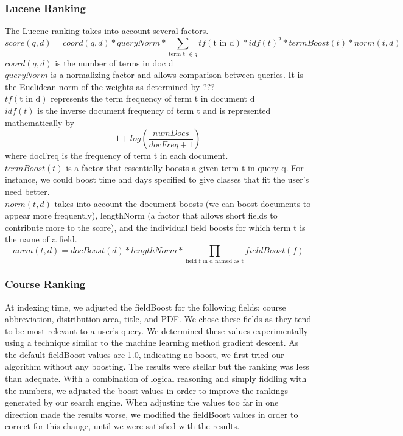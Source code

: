 \documentclass[12pt,letterpaper]{article}
\begin{document}
\subsubsection{Lucene Ranking}
The Lucene ranking takes into account several factors. 
\begin{equation}
  score(q,d) = coord(q,d) * queryNorm * \sum_{\text{term t } \in q}{tf(\text{t in d}) * idf(t)^2 * termBoost(t) * norm(t,d)}
  \label{eq:practical}
\end{equation}
$coord(q,d)$ is the number of terms in doc d\\
$queryNorm$ is a normalizing factor and allows comparison between queries. It is the Euclidean norm of the weights as determined by ???\\
$tf(\text{t in d})$ represents the term frequency of term t in document d \\
$idf(t)$ is the inverse document frequency of term t and is represented mathematically by \[ 1 + log(\frac{numDocs}{docFreq + 1}) \] where docFreq is the frequency of term t in each document. \\
$termBoost(t)$ is a factor that essentially boosts a given term t in query q. For instance, we could boost time and days specified to give classes that fit the user's need better.\\
$norm(t, d)$ takes into account the document boosts (we can boost documents to appear more frequently), lengthNorm (a factor that allows short fields to contribute more to the score), and the individual field boosts for which term t is the name of a field. 
\[ norm(t,d) = docBoost(d) * lengthNorm * \prod_{\text{field f in d named as t}}{fieldBoost(f)} \] 				

\subsubsection{Course Ranking}
At indexing time, we adjusted the fieldBoost for the following fields: course abbreviation, distribution area, title, and PDF. We chose these fields as they tend to be most relevant to a user's query. We determined these values experimentally using a technique similar to the machine learning method gradient descent. As the default fieldBoost values are 1.0, indicating no boost, we first tried our algorithm without any boosting. The results were stellar but the ranking was less than adequate.
With a combination of logical reasoning and simply fiddling with the numbers, we adjusted the boost values in order to improve the rankings generated by our search engine. When adjusting the values too far in one direction made the results worse, we modified the fieldBoost values in order to correct for this change, until we were satisfied with the results.
\end{document}
